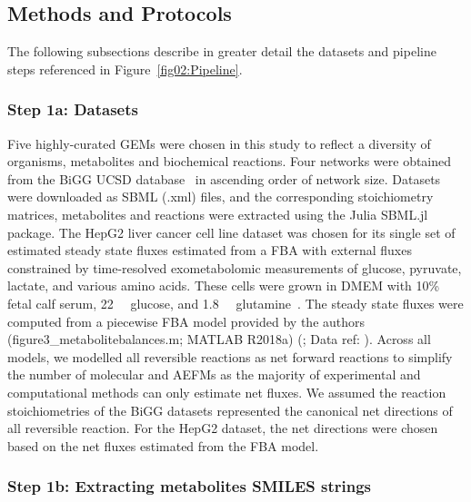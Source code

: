 \documentclass[12pt]{article}
\begin{document}

\subsection*{Methods and Protocols}

The following subsections describe in greater detail the datasets and
pipeline steps referenced in Figure~\ref{fig02:Pipeline}.

\subsubsection*{Step 1a: Datasets}

Five highly-curated GEMs were chosen in this study to reflect a diversity
of organisms, metabolites and biochemical reactions. Four networks were
obtained from the BiGG UCSD database~\citep{KingZacharyA2016BMAp} in
ascending order of network size. Datasets were downloaded as SBML (.xml)
files, and the corresponding stoichiometry matrices, metabolites and
reactions were extracted using the Julia SBML.jl package. The HepG2 liver
cancer cell line dataset was chosen for its single set of estimated steady
state fluxes estimated from a FBA with external fluxes constrained by
time-resolved exometabolomic measurements of glucose, pyruvate, lactate,
and various amino acids. These cells were grown in DMEM with 10\% fetal
calf serum, 22\SI{}{\milli\molar} glucose, and 1.8\SI{}{\milli\molar}
glutamine~\citep{NilssonAvlant2020Qaoa}. The steady state fluxes were
computed from a piecewise FBA model provided by the authors
(figure3\_metabolitebalances.m; MATLAB R2018a)
(\citealt{NilssonAvlant2020Qaoa}; Data ref:
\citealt{NilssonAvlant2020QaoaDATASET}). Across all models, we modelled
all reversible reactions as net forward reactions to simplify the number
of molecular and AEFMs as the majority of experimental and computational
methods can only estimate net fluxes. We assumed the reaction
stoichiometries of the BiGG datasets represented the canonical net
directions of all reversible reaction. For the HepG2 dataset, the net
directions were chosen based on the net fluxes estimated from the FBA
model.

\subsubsection*{Step 1b: Extracting metabolites SMILES strings}
\end{document}
